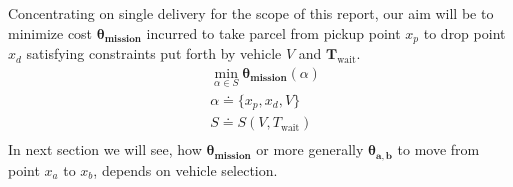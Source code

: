 Concentrating on single delivery for the scope of this report, our aim will be to minimize cost $\boldsymbol{\theta_{\text{mission}}}$ incurred to take parcel from pickup point $x_p$ to drop point $x_d$ satisfying constraints put forth by vehicle $V$ and $\textbf{T}_{\text{wait}}$.
\begin{align*}
    & \displaystyle{\min_{\alpha \in S} \boldsymbol{\theta_{\text{mission}}}(\alpha)} \\
    & \alpha \doteq \{x_p, x_d, V\} \\
    & S \doteq S(V, T_{\text{wait}}) \\
\end{align*}
 In next section we will see, how $\boldsymbol{\theta_{\text{mission}}}$ or more generally $\boldsymbol{\theta_{a,b}}$ to move from point $x_a$ to $x_b$, depends on vehicle selection.



